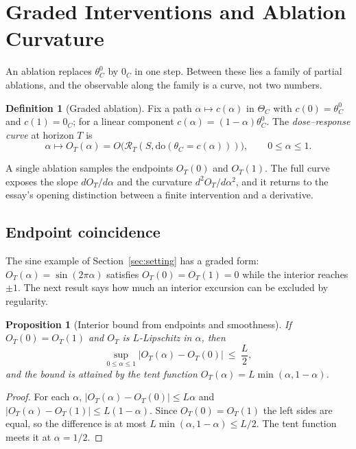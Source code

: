\documentclass[11pt]{article}
\newtheorem{proposition}[theorem]{Proposition}
\theoremstyle{definition}
\newtheorem{definition}[theorem]{Definition}
\theoremstyle{remark}
\newcommand{\Rop}{\mathcal{R}}
\newcommand{\dox}[1]{\mathrm{do}(#1)}
\begin{document}
\section{Graded Interventions and Ablation Curvature}\label{sec:graded}

An ablation replaces $\theta_C^0$ by $0_C$ in one step. Between these lies a family of partial ablations, and the observable along the family is a curve, not two numbers.

\begin{definition}[Graded ablation]
Fix a path $\alpha\mapsto c(\alpha)$ in $\Theta_C$ with $c(0)=\theta^0_C$ and $c(1)=0_C$; for a linear component $c(\alpha)=(1-\alpha)\theta^0_C$. The \emph{dose--response curve} at horizon $T$ is
\[
\alpha\longmapsto O_T(\alpha)=O\bigl(\Rop_T(S,\dox{\theta_C=c(\alpha)})\bigr),\qquad 0\le\alpha\le1 .
\]
\end{definition}

A single ablation samples the endpoints $O_T(0)$ and $O_T(1)$. The full curve exposes the slope $dO_T/d\alpha$ and the curvature $d^2O_T/d\alpha^2$, and it returns to the essay's opening distinction between a finite intervention and a derivative.

\subsection{Endpoint coincidence}

The sine example of Section~\ref{sec:setting} has a graded form: $O_T(\alpha)=\sin(2\pi\alpha)$ satisfies $O_T(0)=O_T(1)=0$ while the interior reaches $\pm1$. The next result says how much an interior excursion can be excluded by regularity.

\begin{proposition}[Interior bound from endpoints and smoothness]\label{prop:tent}
If $O_T(0)=O_T(1)$ and $O_T$ is $L$-Lipschitz in $\alpha$, then
\[
\sup_{0\le\alpha\le1}|O_T(\alpha)-O_T(0)|\ \le\ \frac L2 ,
\]
and the bound is attained by the tent function $O_T(\alpha)=L\min(\alpha,1-\alpha)$.
\end{proposition}
\begin{proof}
For each $\alpha$, $|O_T(\alpha)-O_T(0)|\le L\alpha$ and $|O_T(\alpha)-O_T(1)|\le L(1-\alpha)$. Since $O_T(0)=O_T(1)$ the left sides are equal, so the difference is at most $L\min(\alpha,1-\alpha)\le L/2$. The tent function meets it at $\alpha=1/2$.
\end{proof}
\end{document}
